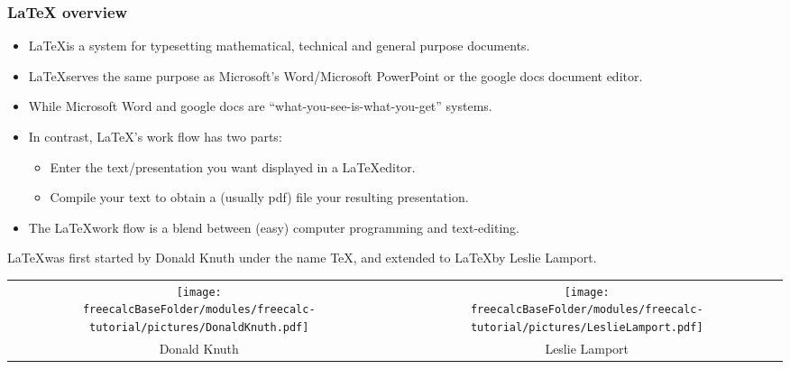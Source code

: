 \begin{frame}
\frametitle{\LaTeX{} overview}
\begin{itemize}
\item \LaTeX is a system for typesetting mathematical, technical and general purpose documents. 
\item \LaTeX serves the same purpose as Microsoft's Word/Microsoft PowerPoint or the google docs document editor.
\item While Microsoft Word and google docs are ``what-you-see-is-what-you-get'' systems.
\item In contrast, \LaTeX's work flow has two parts: 
\begin{itemize}
\item Enter the text/presentation you want displayed in a \LaTeX editor.
\item Compile your text to obtain a (usually pdf) file your resulting presentation.
\end{itemize}
\item The \LaTeX work flow is a blend between (easy) computer programming and text-editing.
\end{itemize}
\end{frame}

\begin{frame}
\LaTeX was first started by Donald Knuth under the name \TeX,
and extended to \LaTeX by Leslie Lamport. 

\hfil\hfil
\begin{tabular}{cc}
\texttt{[image: \\freecalcBaseFolder/modules/freecalc-tutorial/pictures/DonaldKnuth.pdf]} & \texttt{[image: \\freecalcBaseFolder/modules/freecalc-tutorial/pictures/LeslieLamport.pdf]} \\
Donald Knuth & Leslie Lamport
\end{tabular}

\end{frame}